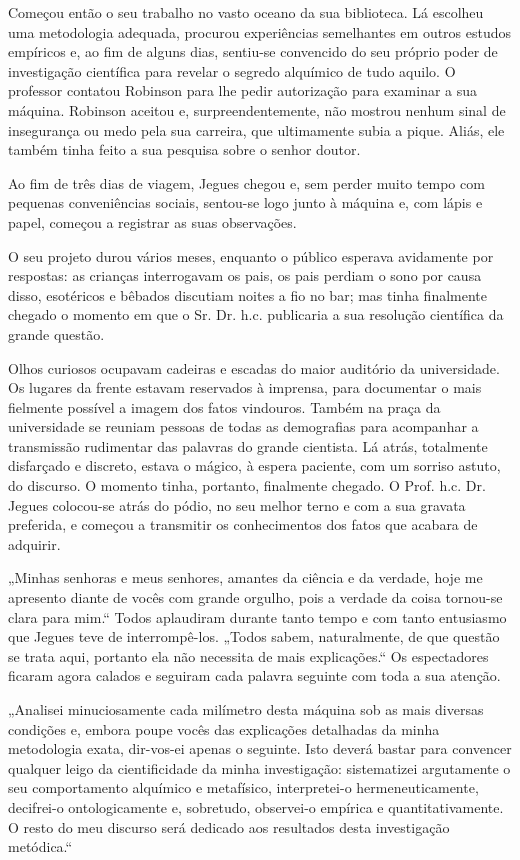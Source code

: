 Começou então o seu trabalho no vasto oceano da sua biblioteca.
Lá escolheu uma metodologia adequada, procurou experiências
semelhantes em outros estudos empíricos e, ao fim de alguns
dias, sentiu-se convencido do seu próprio poder de investigação
científica para revelar o segredo alquímico de tudo aquilo. O
professor contatou Robinson para lhe pedir autorização para
examinar a sua máquina. Robinson aceitou e, surpreendentemente,
não mostrou nenhum sinal de insegurança ou medo pela sua
carreira, que ultimamente subia a pique. Aliás, ele também
tinha feito a sua pesquisa sobre o senhor doutor.

Ao fim de três dias de viagem, Jegues chegou e, sem perder
muito tempo com pequenas conveniências sociais, sentou-se logo
junto à máquina e, com lápis e papel, começou a registrar as
suas observações.

O seu projeto durou vários meses, enquanto o público esperava
avidamente por respostas: as crianças interrogavam os pais, os
pais perdiam o sono por causa disso, esotéricos e bêbados
discutiam noites a fio no bar; mas tinha finalmente chegado o
momento em que o Sr. Dr. h.c. publicaria a sua resolução
científica da grande questão.

Olhos curiosos ocupavam cadeiras e escadas do maior auditório
da universidade. Os lugares da frente estavam reservados à
imprensa, para documentar o mais fielmente possível a imagem
dos fatos vindouros. Também na praça da universidade se reuniam
pessoas de todas as demografias para acompanhar a transmissão
rudimentar das palavras do grande cientista. Lá atrás,
totalmente disfarçado e discreto, estava o mágico, à espera
paciente, com um sorriso astuto, do discurso. O momento tinha,
portanto, finalmente chegado. O Prof. h.c. Dr. Jegues
colocou-se atrás do pódio, no seu melhor terno e com a sua
gravata preferida, e começou a transmitir os conhecimentos dos
fatos que acabara de adquirir.

„Minhas senhoras e meus senhores, amantes da ciência e da
verdade, hoje me apresento diante de vocês com grande orgulho,
pois a verdade da coisa tornou-se clara para mim.“ Todos
aplaudiram durante tanto tempo e com tanto entusiasmo que
Jegues teve de interrompê-los. „Todos sabem, naturalmente, de
que questão se trata aqui, portanto ela não necessita de mais
explicações.“ Os espectadores ficaram agora calados e seguiram
cada palavra seguinte com toda a sua atenção.

„Analisei minuciosamente cada milímetro desta máquina sob as
mais diversas condições e, embora poupe vocês das explicações
detalhadas da minha metodologia exata, dir-vos-ei apenas o
seguinte. Isto deverá bastar para convencer qualquer leigo da
cientificidade da minha investigação: sistematizei argutamente
o seu comportamento alquímico e metafísico, interpretei-o
hermeneuticamente, decifrei-o ontologicamente e, sobretudo,
observei-o empírica e quantitativamente. O resto do meu
discurso será dedicado aos resultados desta investigação
metódica.“

